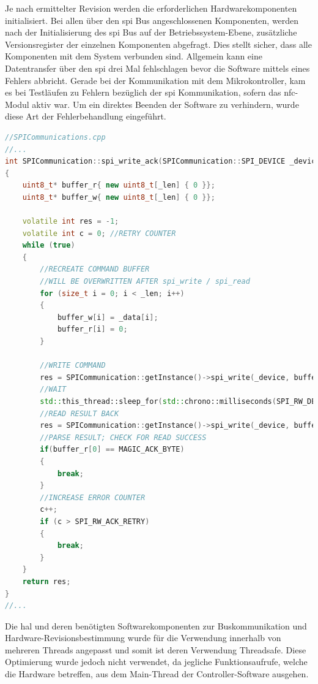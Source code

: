Je nach ermittelter Revision werden die erforderlichen
Hardwarekomponenten initialisiert. Bei allen über den \gls{spi} Bus
angeschlossenen Komponenten, werden nach der Initialisierung des
\gls{spi} Bus auf der Betriebssystem-Ebene, zusätzliche Versionsregister
der einzelnen Komponenten abgefragt. Dies stellt sicher, dass alle
Komponenten mit dem System verbunden sind. Allgemein kann eine
Datentransfer über den \gls{spi} drei Mal fehlschlagen bevor die
Software mittels eines Fehlers abbricht. Gerade bei der Kommunikation
mit dem Mikrokontroller, kam es bei Testläufen zu Fehlern bezüglich der
\gls{spi} Kommunikation, sofern das \gls{nfc}-Modul aktiv war. Um ein
direktes Beenden der Software zu verhindern, wurde diese Art der
Fehlerbehandlung eingeführt.

\begin{lstlisting}[language={C++}]
//SPICommunications.cpp
//...
int SPICommunication::spi_write_ack(SPICommunication::SPI_DEVICE _device, uint8_t* _data, int _len)
{
    uint8_t* buffer_r{ new uint8_t[_len] { 0 }};
    uint8_t* buffer_w{ new uint8_t[_len] { 0 }};

    volatile int res = -1;
    volatile int c = 0; //RETRY COUNTER
    while (true)
    {
        //RECREATE COMMAND BUFFER
        //WILL BE OVERWRITTEN AFTER spi_write / spi_read
        for (size_t i = 0; i < _len; i++)
        {
            buffer_w[i] = _data[i];
            buffer_r[i] = 0;
        }
        
        //WRITE COMMAND
        res = SPICommunication::getInstance()->spi_write(_device, buffer_w, _len);
        //WAIT
        std::this_thread::sleep_for(std::chrono::milliseconds(SPI_RW_DELAY));
        //READ RESULT BACK
        res = SPICommunication::getInstance()->spi_write(_device, buffer_r, _len);
        //PARSE RESULT; CHECK FOR READ SUCCESS
        if(buffer_r[0] == MAGIC_ACK_BYTE)
        {
            break;
        }
        //INCREASE ERROR COUNTER
        c++;
        if (c > SPI_RW_ACK_RETRY)
        {
            break;
        }
    }
    return res;
}
//...
\end{lstlisting}

Die \gls{hal} und deren benötigten Softwarekomponenten zur
Buskommunikation und Hardware-Revisionsbestimmung wurde für die
Verwendung innerhalb von mehreren Threads angepasst und somit ist deren
Verwendung Threadsafe. Diese Optimierung wurde jedoch nicht verwendet,
da jegliche Funktionsaufrufe, welche die Hardware betreffen, aus dem
Main-Thread der Controller-Software ausgehen.

